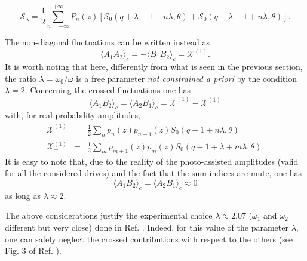 \documentclass[twocolumn,showpacs,preprintnumbers,amsmath,amssymb%
 aps,
 prb,
 lengthcheck,%
]{revtex4-1}
\def\be{\begin{equation}}
\def\ee{\end{equation}}
\def\beq{\begin{eqnarray}}
\def\eeq{\end{eqnarray}}
\begin{document}
\begin{widetext}
\be
\tilde{\mathcal{S}}_{\lambda}= \frac{1}{2} \sum_{n=-\infty}^{+\infty}P_{n} (z) \left[\mathcal{S}_{0} (q+\lambda-1+n\lambda,\theta)+ \mathcal{S}_{0} (q-\lambda+1+n\lambda,\theta)\right].
\ee
\end{widetext}
The non-diagonal fluctuations can be written instead as
\be
\langle A_{1} A_{2} \rangle_{c}=-\langle B_{1} B_{2}\rangle_{c}= \mathcal{X}^{(1)}.
\ee
It is worth noting that here, differently from what is seen in the previous section, the ratio $\lambda=\omega_{0}/\omega$ is a free parameter \emph{not constrained a priori} by the condition $\lambda=2$.
Concerning the crossed fluctuations one has
\be
\langle A_{1} B_{2} \rangle_{c}= \langle A_{2} B_{1} \rangle_{c}= \mathcal{X}^{(1)}_{+}- \mathcal{X}^{(1)}_{-}
\ee
with, for real probability amplitudes, 
 \beq
 \mathcal{X}^{(1)}_{+}&=&\frac{1}{2} \sum_{n} p_{n}(z) p_{n+1}(z) S_{0}(q+1+n\lambda, \theta)\\
  \mathcal{X}^{(1)}_{-}
  &=&\frac{1}{2}\sum_{m} p_{m+1}(z) p_{m}(z) S_{0}(q-1+\lambda+m\lambda, \theta). 
 \eeq
It is easy to note that, due to the reality of the photo-assisted amplitudes (valid for all the considered drives) and the fact that the sum indices are mute, one has
\be
\langle A_{1} B_{2} \rangle_{c}=  \langle A_{2} B_{1} \rangle_{c}\approx 0
\ee 
as long as $\lambda \approx 2$. 

The above considerations justify the experimental choice $\lambda\approx 2.07$ ($\omega_{1}$ and $\omega_{2}$ different but very close) done in Ref. . Indeed, for this value of the parameter $\lambda$, one can safely neglect the crossed contributions with respect to the others (see Fig. 3 of Ref. ).
\end{document}
